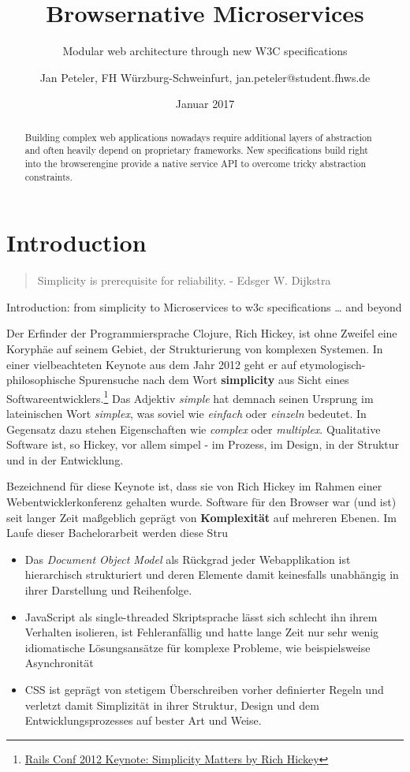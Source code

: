 \documentclass[]{assets/latex/ieee}
\title{Browsernative Microservices}
\subtitle{Modular web architecture through new W3C specifications}
\author{Jan Peteler, FH Würzburg-Schweinfurt, jan.peteler@student.fhws.de}
\date{Januar 2017}
\providecommand{\tightlist}{%
  \setlength{\itemsep}{0pt}\setlength{\parskip}{0pt}}
\begin{document}
\maketitle
\begin{abstract}
Building complex web applications nowadays require additional layers of
abstraction and often heavily depend on proprietary frameworks. New
specifications build right into the browserengine provide a native
service API to overcome tricky abstraction constraints.
\end{abstract}

\section{Introduction}\label{introduction}

\begin{quote}
Simplicity is prerequisite for reliability. - Edsger W. Dijkstra
\end{quote}

Introduction: from simplicity to Microservices to w3c specifications
\ldots{} and beyond

Der Erfinder der Programmiersprache Clojure, Rich Hickey, ist ohne
Zweifel eine Koryphäe auf seinem Gebiet, der Strukturierung von
komplexen Systemen. In einer vielbeachteten Keynote aus dem Jahr 2012
geht er auf etymologisch-philosophische Spurensuche nach dem Wort
\textbf{simplicity } aus Sicht eines Softwareentwicklers.\footnote{\href{https://www.youtube.com/watch?v=rI8tNMsozo0\&t=48s}{Rails
  Conf 2012 Keynote: Simplicity Matters by Rich Hickey}} Das Adjektiv
\emph{simple} hat demnach seinen Ursprung im lateinischen Wort
\emph{simplex}, was soviel wie \emph{einfach} oder \emph{einzeln}
bedeutet. In Gegensatz dazu stehen Eigenschaften wie \emph{complex} oder
\emph{multiplex}. Qualitative Software ist, so Hickey, vor allem simpel
- im Prozess, im Design, in der Struktur und in der Entwicklung.

Bezeichnend für diese Keynote ist, dass sie von Rich Hickey im Rahmen
einer Webentwicklerkonferenz gehalten wurde. Software für den Browser
war (und ist) seit langer Zeit maßgeblich geprägt von
\textbf{Komplexität} auf mehreren Ebenen. Im Laufe dieser Bachelorarbeit
werden diese Stru

\begin{itemize}
\tightlist
\item
  Das \emph{Document Object Model} als Rückgrad jeder Webapplikation ist
  hierarchisch strukturiert und deren Elemente damit keinesfalls
  unabhängig in ihrer Darstellung und Reihenfolge.
\item
  JavaScript als single-threaded Skriptsprache lässt sich schlecht ihn
  ihrem Verhalten isolieren, ist Fehleranfällig und hatte lange Zeit nur
  sehr wenig idiomatische Lösungsansätze für komplexe Probleme, wie
  beispielsweise Asynchronität
\item
  CSS ist geprägt von stetigem Überschreiben vorher definierter Regeln
  und verletzt damit Simplizität in ihrer Struktur, Design und dem
  Entwicklungsprozesses auf bester Art und Weise.
\end{itemize}
\end{document}
